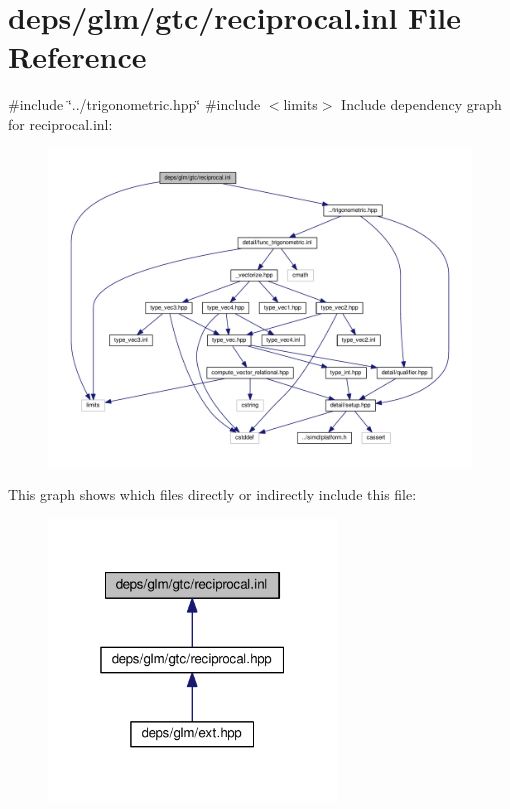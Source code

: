 \hypertarget{reciprocal_8inl}{}\section{deps/glm/gtc/reciprocal.inl File Reference}
\label{reciprocal_8inl}
{\ttfamily \#include \char`\"{}../trigonometric.\+hpp\char`\"{}}\newline
{\ttfamily \#include $<$limits$>$}\newline
Include dependency graph for reciprocal.\+inl\+:
\nopagebreak
\begin{figure}[H]
\begin{center}
\leavevmode
\includegraphics[width=350pt]{d1/db7/reciprocal_8inl__incl}
\end{center}
\end{figure}
This graph shows which files directly or indirectly include this file\+:
\nopagebreak
\begin{figure}[H]
\begin{center}
\leavevmode
\includegraphics[width=217pt]{d7/da4/reciprocal_8inl__dep__incl}
\end{center}
\end{figure}

